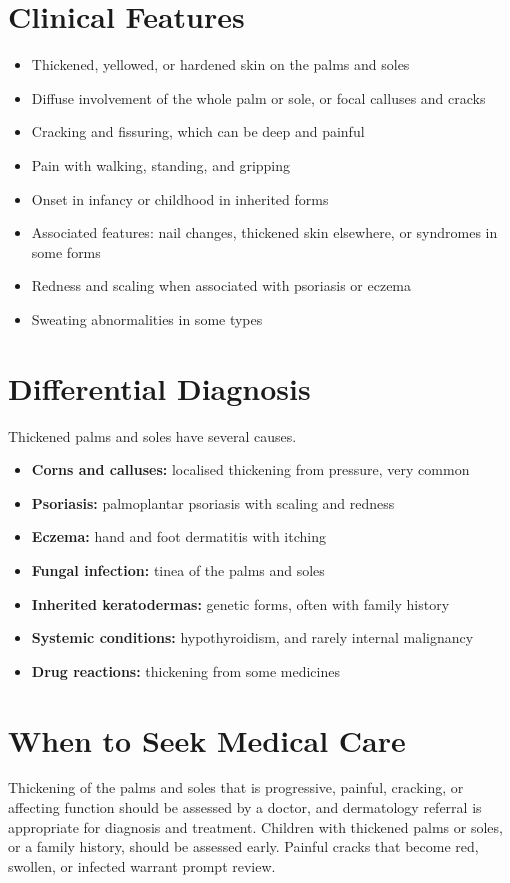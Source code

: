 \section*{Clinical Features}
\begin{itemize}
    \item Thickened, yellowed, or hardened skin on the palms and soles
    \item Diffuse involvement of the whole palm or sole, or focal calluses and cracks
    \item Cracking and fissuring, which can be deep and painful
    \item Pain with walking, standing, and gripping
    \item Onset in infancy or childhood in inherited forms
    \item Associated features: nail changes, thickened skin elsewhere, or syndromes in some forms
    \item Redness and scaling when associated with psoriasis or eczema
    \item Sweating abnormalities in some types
\end{itemize}

\section*{Differential Diagnosis}
Thickened palms and soles have several causes.
\begin{itemize}
    \item \textbf{Corns and calluses:} localised thickening from pressure, very common
    \item \textbf{Psoriasis:} palmoplantar psoriasis with scaling and redness
    \item \textbf{Eczema:} hand and foot dermatitis with itching
    \item \textbf{Fungal infection:} tinea of the palms and soles
    \item \textbf{Inherited keratodermas:} genetic forms, often with family history
    \item \textbf{Systemic conditions:} hypothyroidism, and rarely internal malignancy
    \item \textbf{Drug reactions:} thickening from some medicines
\end{itemize}

\section*{When to Seek Medical Care}
Thickening of the palms and soles that is progressive, painful, cracking, or affecting function should be assessed by a doctor, and dermatology referral is appropriate for diagnosis and treatment. Children with thickened palms or soles, or a family history, should be assessed early. Painful cracks that become red, swollen, or infected warrant prompt review.

